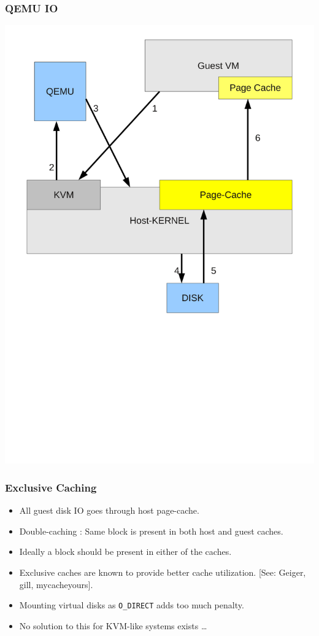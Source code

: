 \documentclass{beamer}
\begin{document}
\begin{frame}
  \frametitle{QEMU IO}
\includegraphics[scale=0.40]{qemu.pdf}

\end{frame}

\begin{frame}
  \frametitle{Exclusive Caching}
  \begin{itemize}
  \item All guest disk IO goes through host page-cache.
  \item Double-caching : Same block is present in both host and guest caches.
  \item Ideally a block should be present in either of the caches.
  \item Exclusive caches are known to provide better cache utilization. [See: Geiger, gill, mycacheyours].
  \item Mounting virtual disks as \texttt{O\_DIRECT} adds too much penalty.
  \item No solution to this for KVM-like systems exists \ldots

  \end{itemize}
\end{frame}
\end{document}

